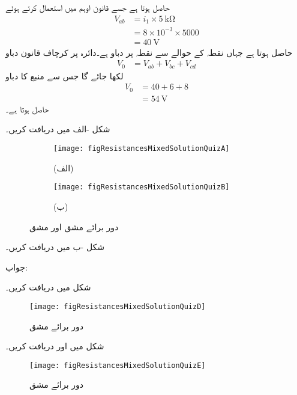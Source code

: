 حاصل ہوتا ہے جسے قانون اوہم میں استعمال کرتے ہوئے
\begin{align*}
V_{ab}&=i_1 \times \SI{5}{\kilo\ohm}\\
&=8\times 10^{-3}\times 5000\\
&=\SI{40}{\volt}
\end{align*}
حاصل ہوتا ہے جہاں  نقطہ  کے حوالے سے نقطہ  پر دباو ہے۔دائرہ  پر کرچاف قانون دباو
\begin{align*}
V_0&=V_{ab}+V_{bc}+V_{cd}
\end{align*}
لکھا جائے گا جس سے منبع کا دباو
\begin{align*}
V_0&=40+6+8\\
&=\SI{54}{\volt}
\end{align*}
حاصل ہوتا ہے۔
\FloatBarrier

شکل -الف میں  دریافت کریں۔
\begin{figure}
\centering
\begin{subfigure}{0.5\textwidth}
\centering
\texttt{[image: figResistancesMixedSolutionQuizA]}
\caption*{(الف)}
\end{subfigure}%
\begin{subfigure}{0.5\textwidth}
\centering
\texttt{[image: figResistancesMixedSolutionQuizB]}
\caption*{(ب)}
\end{subfigure}%
\caption{دور برائے مشق  اور مشق }
\label{شکل_مزاحمتی_متعدد_مشق_الف}
\end{figure}

شکل -ب میں  دریافت کریں۔  

جواب: 

شکل  میں  دریافت کریں۔
\begin{figure}
\centering
\texttt{[image: figResistancesMixedSolutionQuizD]}
\caption{دور برائے مشق }
\label{شکل_مزاحمتی_متعدد_مشق_پ}
\end{figure}
\FloatBarrier

شکل  میں   اور  دریافت کریں۔
\begin{figure}
\centering
\texttt{[image: figResistancesMixedSolutionQuizE]}
\caption{دور برائے مشق }
\label{شکل_مزاحمتی_متعدد_مشق_ت}
\end{figure}
\FloatBarrier

